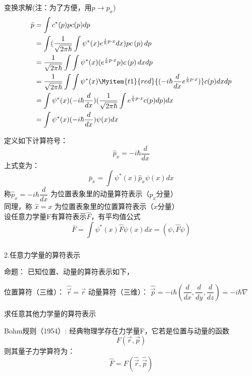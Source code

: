 \begin{frame}
    变换求解(注：为了方便，用$p \to p_x$)
    \begin{equation*}
        \begin{split}
            \bar{p}&=\int c^{*}(p) p c(p) d p \\  
            &=\int (\frac{1}{\sqrt{2 \pi \hbar}} \int \psi^{*}(x) e^{\frac{i}{\hbar} p\cdot x} d x) p c\left(p\right) d p \\
            &=\frac{1}{\sqrt{2 \pi \hbar}} \int \int \psi^{*}(x) (e^{\frac{i}{\hbar} p\cdot x}  p) c\left(p\right) d xd p \\
            &=\frac{1}{\sqrt{2 \pi \hbar}} \int \int \psi^{*}(x) \Myitem{t1}{red}{(-i\hbar\frac{d}{d x} e^{\frac{i}{\hbar} p\cdot x})} c(p) d xd p \\
            &=\int \psi^{*}(x) (-i\hbar\frac{d}{d x}) (\frac{1}{\sqrt{2 \pi \hbar}} \int e^{\frac{i}{\hbar} p\cdot x} c(p) d p)  d x\\
            &=\int \psi^{*}(x) (-i\hbar\frac{d}{d x}) \psi(x)  d x\\
         \end{split}
    \end{equation*}  
\end{frame} 

\begin{frame}
    定义如下计算符号：
    $$ \boxed{\hat{p}_x= -i\hbar\frac{d}{d x}} $$ 
    上式变为：         
    $$\boxed{\bar{p}_x=\int \psi^{*}(x) \hat{p}_x \psi(x) d x} $$
    称$ \hat{p}_x= -i\hbar\dfrac{d}{d x} $ 为位置表象里的动量算符表示（$p_x$分量）\\
    同理，称 $\hat{x}= x $ 为位置表象里的位置算符表示（$x$分量）\\ \vspace{0.3em}
    设任意力学量F有算符表示$\hat{F}$，有平均值公式\\
    $$\boxed{\bar{F}=\int \psi^{*}(x) \hat{F} \psi(x) d x =(\psi, \hat{F} \psi)}$$
\end{frame} 

\begin{frame} 
    \frametitle{}
    2.任意力学量的算符表示
    \begin{tcolorbox1}{命题：}
    已知位置、动量的算符表示如下，
    \begin{itemize}
        \Item  位置算符（三维）： $ \hat{\vec{r}} =\vec{r} $
        \Item  动量算符（三维）： $ \hat{\vec{p}} =-i\hbar(\dfrac{d}{d x}, \dfrac{d}{d y} , \dfrac{d}{d z})=-i\hbar \nabla $
    \end{itemize}
    求任意其他力学量的算符表示
    \end{tcolorbox1}
    \alert{Bohm规则（1954）:} 经典物理学存在力学量F，它若是位置与动量的函数
    \[F(\vec{r},\vec{p})\]
    则其量子力学算符为：
    \[\hat{F}=F(\hat{\vec{r}},\hat{\vec{p}})\]
\end{frame} 

